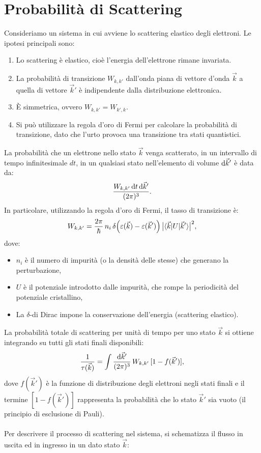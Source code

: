 \section{Probabilità di Scattering}
Consideriamo un sistema in cui avviene lo scattering elastico degli elettroni. Le ipotesi principali sono:
\begin{enumerate}
    \item Lo scattering è elastico, cioè l'energia dell'elettrone rimane invariata.
    \item La probabilità di transizione \(W_{k,k'}\) dall'onda piana di vettore d'onda \(\vec{k}\) a quella di vettore \(\vec{k}'\) è indipendente dalla distribuzione elettronica.
    \item È simmetrica, ovvero \(W_{k,k'} = W_{k',k}\).
    \item Si può utilizzare la regola d'oro di Fermi per calcolare la probabilità di transizione, dato che l'urto provoca una transizione tra stati quantistici.
\end{enumerate}
La probabilità che un elettrone nello stato \(\vec{k}\) venga scatterato, in un intervallo di tempo infinitesimale \(dt\), in un qualsiasi stato nell'elemento di volume \(\text{d}\vec{k}'\) è data da:
\[
\frac{W_{k,k'}\,\text{d}{t}\,\text{d}\vec{k}'}{(2\pi)^3}.
\]
In particolare, utilizzando la regola d'oro di Fermi, il tasso di transizione è:
\[
W_{k,k'} = \frac{2\pi}{\hbar}\, n_i\, \delta\Bigl(\varepsilon(\vec{k})-\varepsilon(\vec{k}')\Bigr)\, \bigl|\langle \vec{k}|U|\vec{k}'\rangle \bigr|^2,
\]
dove:
\begin{itemize}
    \item \(n_i\) è il numero di impurità (o la densità delle stesse) che generano la perturbazione,
    \item \(U\) è il potenziale introdotto dalle impurità, che rompe la periodicità del potenziale cristallino,
    \item La \(\delta\)-di Dirac impone la conservazione dell'energia (scattering elastico).
\end{itemize}
La probabilità totale di scattering per unità di tempo per uno stato \(\vec{k}\) si ottiene integrando su tutti gli stati finali disponibili:
\[
\frac{1}{\tau(\vec{k})} = \int \frac{\text{d}\vec{k}'}{(2\pi)^3}\, W_{k,k'}\,[1-f(\vec{k}')],
\]
dove \(f(\vec{k}')\) è la funzione di distribuzione degli elettroni negli stati finali e il termine \([1-f(\vec{k}')]\) rappresenta la probabilità che lo stato \(\vec{k}'\) sia vuoto (il principio di esclusione di Pauli).\\\\
Per descrivere il processo di scattering nel sistema, si schematizza il flusso in uscita ed in ingresso in un dato stato \(\vec{k}\):

